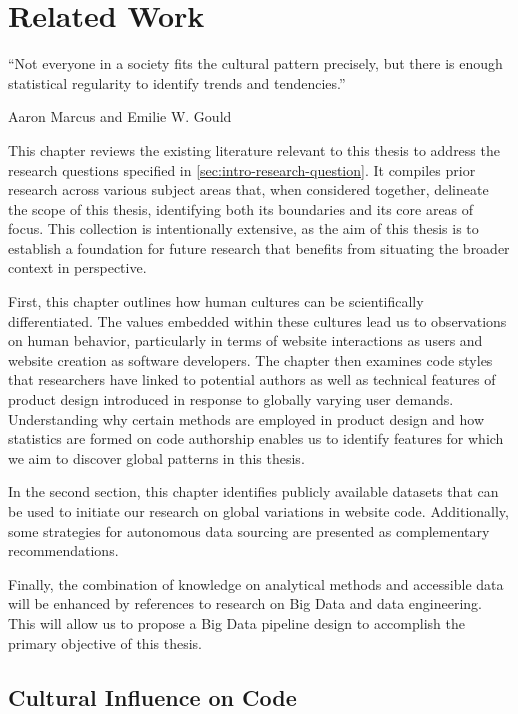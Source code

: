 \section{Related Work}
\label{sec:related-work}

\epigraph{
    ``Not everyone in a society fits the cultural pattern precisely, but there is enough statistical regularity to identify trends and tendencies.''
}{
    Aaron Marcus and Emilie W. Gould~\cite{Marcus2010}
}

This chapter reviews the existing literature relevant to this thesis to address the research questions specified in \cref{sec:intro-research-question}.
It compiles prior research across various subject areas that, when considered together, delineate the scope of this thesis, identifying both its boundaries and its core areas of focus.
This collection is intentionally extensive, as the aim of this thesis is to establish a foundation for future research that benefits from situating the broader context in perspective.

First, this chapter outlines how human cultures can be scientifically differentiated.
The values embedded within these cultures lead us to observations on human behavior, particularly in terms of website interactions as users and website creation as software developers.
The chapter then examines code styles that researchers have linked to potential authors as well as technical features of product design introduced in response to globally varying user demands.
Understanding why certain methods are employed in product design and how statistics are formed on code authorship enables us to identify features for which we aim to discover global patterns in this thesis.

In the second section, this chapter identifies publicly available datasets that can be used to initiate our research on global variations in website code.
Additionally, some strategies for autonomous data sourcing are presented as complementary recommendations.

Finally, the combination of knowledge on analytical methods and accessible data will be enhanced by references to research on Big Data and data engineering.
This will allow us to propose a Big Data pipeline design to accomplish the primary objective of this thesis.


\subsection{Cultural Influence on Code}
\label{sec:related-work-culture}


